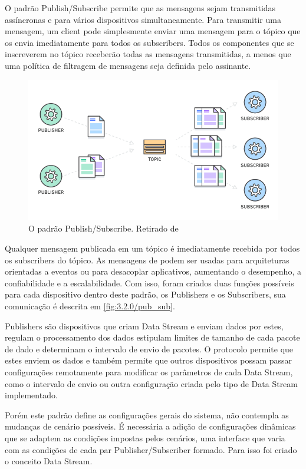 O padrão Publish/Subscribe permite que as mensagens sejam transmitidas assíncronas e para vários dispositivos simultaneamente. Para transmitir uma mensagem, um client pode simplesmente enviar uma mensagem para o tópico que os envia imediatamente para todos os subscribers. Todos os componentes que se inscreverem no tópico receberão todas as mensagens transmitidas, a menos que uma política de filtragem de mensagens seja definida pelo assinante.

\begin{figure}[h!]
\centering
\includegraphics[width=12cm]{./02_Capitulos/02_Cap3/figures/aws_pub_sub}
\caption{O padrão Publish/Subscribe. Retirado de \cite{amazon:pub-sub}}
\label{fig:3.2.0/aws_pub_sub}
\end{figure}

Qualquer mensagem publicada em um tópico é imediatamente recebida por todos os subscribers do tópico. As mensagens de podem ser usadas para arquiteturas orientadas a eventos ou para desacoplar aplicativos, aumentando  o desempenho, a confiabilidade e a escalabilidade. Com isso, foram criados duas funções possíveis para cada dispositivo dentro deste padrão, os Publishers e os Subscribers, sua comunicação é descrita em \ref{fig:3.2.0/pub_sub}.


Publishers são dispositivos que criam Data Stream  e enviam dados por estes, regulam o processamento dos dados estipulam limites de tamanho de cada pacote de dado e determinam o intervalo de envio de pacotes. O protocolo permite que estes enviem os dados e também permite que outros dispositivos possam passar configurações remotamente para modificar os parâmetros de cada Data Stream, como o intervalo de envio ou outra configuração criada pelo tipo de Data Stream implementado. 

Porém este padrão define as configurações gerais do sistema, não contempla as mudanças de cenário possíveis. É necessária a adição de configurações dinâmicas que se adaptem as condições impostas pelos cenários, uma interface que varia com as condições de cada par Publisher/Subscriber formado. Para isso foi criado o conceito Data Stream.


